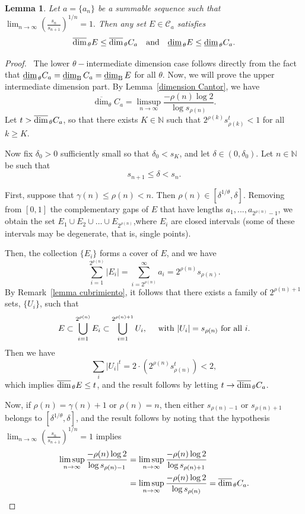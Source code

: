 \documentclass[11pt,reqno,bookmarksnumbered,raiselinks,breaklinks,colorlinks,plainpages]{amsart}
\newcommand\lbd{\underline{\mbox{\rm dim}}_{\rm B}\,} %
\newcommand\da{\underline{\mbox{\rm dim}}_{\,\theta}} %
\newcommand\uda{\overline{\mbox{\rm dim}}_{\,\theta}} %
\newtheorem{lem}[theo]{Lemma}
\begin{document}
\begin{lem}
Let \( a = \{a_n\} \) be a summable sequence such that  
\(
\displaystyle\lim_{n \to \infty} \left( \frac{s_n}{s_{n+1}} \right)^{1/n} = 1.
\)  
Then any set \( E \in \mathcal{C}_a \) satisfies  
\[
\uda E \leq \uda C_a \quad \text{and} \quad \da E \leq \da C_a.
\]
\end{lem}
\begin{proof}\
The lower $\theta-$intermediate dimension case follows directly from the fact that $\da C_a=\lbd C_a=\lbd E$ for all $\theta.$
 Now, we will prove the upper intermediate dimension part. By Lemma~\ref{dimension Cantor}, we have
\[
\overline{\dim}_\theta C_a =
\limsup_{n \to \infty} \frac{-\rho(n) \log 2}{\log s_{\rho(n)}}.
\]
Let \( t > \uda C_a \), so that there exists \( K \in \mathbb{N} \) such that \( 2^{\rho(k)} s_{\rho(k)}^t < 1 \) for all \( k \geq K \).

Now fix \( \delta_0 > 0 \) sufficiently small so that \( \delta_0 < s_K \), and let \( \delta \in (0, \delta_0) \). Let \( n \in \mathbb{N} \) be such that
\[
s_{n+1} \leq \delta < s_n.
\]



First, suppose that \( \gamma(n) \leq \rho(n) < n \). Then \( \rho(n) \in [\delta^{1/\theta}, \delta] \). 
Removing from $[0,1]$ the complementary gaps of $E$ that have lengths $a_1,...,a_{2^{\rho(n)} - 1}$, we obtain the set \( E_1\cup E_2\cup \dots \cup E_{2^{\rho(n)}} \),where $E_i$ are closed intervals (some of these intervals may be degenerate, that is, single points).

Then, the collection \( \{E_i\} \) forms a cover of \( E \), and we have
\[
\sum_{i=1}^{2^{\rho(n)}} |E_i| = \sum_{i=2^{\rho(n)}}^{\infty} a_i = 2^{\rho(n)} s_{\rho(n)}.
\]
By Remark~\ref{lemma cubrimiento}, it follows that there exists a family of \( 2^{\rho(n)+1} \) sets, \( \{U_i\} \), such that
\[
E \subset \bigcup_{i=1}^{2^{\rho(n)}} E_i \subset \bigcup_{i=1}^{2^{\rho(n)+1}} U_i,
\quad \text{
with \( |U_i| = s_{\rho(n)} \) for all \( i \)}.
\]
Then we have
\[
\sum_i |U_i|^t = 2 \cdot \left( 2^{\rho(n)} s_{\rho(n)}^t \right) < 2,
\]
which implies \( \uda E \leq t \), and the result follows by letting \( t \to \uda C_a \).

Now, if \( \rho(n) = \gamma(n) + 1 \) or \( \rho(n) = n \), then either \( s_{\rho(n)-1} \) or \( s_{\rho(n)+1} \) belongs to \( [\delta^{1/\theta}, \delta] \), and the result follows by noting that the hypothesis 
\(
\lim_{n \to \infty} \left( \frac{s_n}{s_{n+1}} \right)^{1/n} = 1
\)
implies
\begin{align*}
\limsup_{n \to \infty} \frac{-\rho(n)\log 2}{\log s_{\rho(n)-1}}  
&= \limsup_{n \to \infty} \frac{-\rho(n)\log 2}{\log s_{\rho(n)+1}}    
\\ &= \limsup_{n \to \infty} \frac{-\rho(n)\log 2}{\log s_{\rho(n)}} 
= \uda C_a.
\end{align*}
\end{proof}
 
\end{document}

